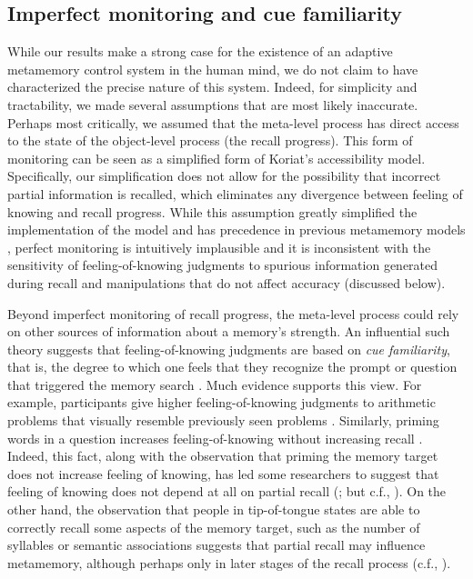 \subsection{Imperfect monitoring and cue familiarity}
While our results make a strong case for the existence of an adaptive metamemory control system in the human mind, we do not claim to have characterized the precise nature of this system. Indeed, for simplicity and tractability, we made several assumptions that are most likely inaccurate. 
Perhaps most critically, we assumed that the meta-level process has direct access to the state of the object-level process (the recall progress). This form of monitoring can be seen as a simplified form of Koriat's \citeyearpar{koriat1993how} accessibility model. Specifically, our simplification does not allow for the possibility that incorrect partial information is recalled, which eliminates any divergence between feeling of knowing and recall progress. While this assumption greatly simplified the implementation of the model and has precedence in previous metamemory models \citep{suchow2016deciding,hu2019role}, perfect monitoring is intuitively implausible and it is inconsistent with the sensitivity of feeling-of-knowing judgments to spurious information generated during recall \citep{koriat1993how} and manipulations that do not affect accuracy (discussed below).

Beyond imperfect monitoring of recall progress, the meta-level process could rely on other sources of information about a memory's strength. An influential such theory suggests that feeling-of-knowing judgments are based on \emph{cue familiarity}, that is, the degree to which one feels that they recognize the prompt or question that triggered the memory search \citep{metcalfe1993cuefamiliarity}. Much evidence supports this view. For example, participants give higher feeling-of-knowing judgments to arithmetic problems that visually resemble previously seen problems \citep{reder1992determines}. Similarly, priming words in a question increases feeling-of-knowing without increasing recall \citep{reder1987strategy,reder1988strategic,schwartz1992cue}. Indeed, this fact, along with the observation that priming the memory target does not increase feeling of knowing, has led some researchers to suggest that feeling of knowing does not depend at all on partial recall (\citealp{reder1992determines,schwartz1992cue}; but c.f., \citealp{jameson1990influence,narens1994subthreshold}). On the other hand, the observation that people in tip-of-tongue states are able to correctly recall some aspects of the memory target, such as the number of syllables \citep{brown1966tip} or semantic associations \citep{koriat1993how,schacter1985attribute} suggests that partial recall may influence metamemory, although perhaps only in later stages of the recall process (c.f., \citealp{nhouyvanisvong1998rapid}).

